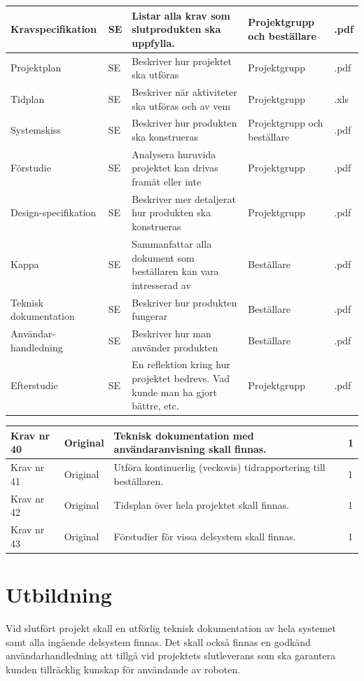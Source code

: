 \documentclass[11pt]{article}
\begin{document}
\begin{flushleft}
\begin{center}
\begin{longtable}{|p{.24\linewidth}|p{.08\linewidth}|p{.25\linewidth}|p{.19\linewidth}|p{.1\linewidth}|}
Kravspecifikation & SE & Listar alla krav som slutprodukten ska uppfylla. & Projektgrupp och beställare & .pdf \\ \hline
Projektplan & SE & Beskriver hur projektet ska utföras & Projektgrupp & .pdf \\ \hline
Tidplan & SE & Beskriver när aktiviteter ska utföras och av vem & Projektgrupp & .xls \\ \hline
Systemskiss & SE & Beskriver hur produkten ska konstrueras& Projektgrupp och beställare & .pdf \\ \hline
Förstudie & SE & Analysera huruvida projektet kan drivas framåt eller inte & Projektgrupp & .pdf \\ \hline
Design-specifikation & SE & Beskriver mer detaljerat hur produkten ska konstrueras & Projektgrupp & .pdf \\ \hline
Kappa & SE & Sammanfattar alla dokument som beställaren kan vara intresserad av & Beställare & .pdf \\ \hline
Teknisk dokumentation & SE & Beskriver hur produkten fungerar & Beställare & .pdf \\ \hline
Användar-handledning & SE & Beskriver hur man använder produkten& Beställare & .pdf \\ \hline
Efterstudie & SE & En reflektion kring hur projektet bedrevs. Vad kunde man ha gjort bättre, etc.& Projektgrupp & .pdf \\ \hline

\end{longtable}
\end{center}

\begin{center}
\begin{longtable}{|l|l|p{.70\linewidth}|l|} \hline
Krav nr 40 & 
Original & 
Teknisk dokumentation med användaranvisning skall finnas. &
1 \\ \hline

Krav nr 41 &
Original &
Utföra kontinuerlig (veckovis) tidrapportering till beställaren. &
1 \\ \hline

Krav nr 42 &
Original &
Tidsplan över hela projektet skall finnas. &
1 \\ \hline

Krav nr 43 &
Original &
Förstudier för vissa delsystem skall finnas. &
1 \\ \hline
\end{longtable}
\end{center}

\section{Utbildning}
Vid slutfört projekt skall en utförlig teknisk dokumentation av hela systemet samt alla ingående delsystem finnas. Det skall också finnas en godkänd användarhandledning att tillgå vid projektets slutleverans som ska garantera kunden tillräcklig kunskap för användande av roboten.



\end{flushleft}
\end{document}
